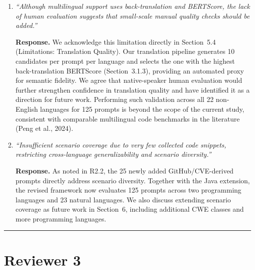 \documentclass[12pt]{article}
\begin{document}
\begin{enumerate}[leftmargin=*, label=\textbf{R2.\arabic*.}]
\item \textit{``Although multilingual support uses back-translation and BERTScore, the
lack of human evaluation suggests that small-scale manual quality checks should be
added.''}

\textbf{Response.}
We acknowledge this limitation directly in Section~5.4 (Limitations: Translation
Quality). Our translation pipeline generates 10 candidates per prompt per language
and selects the one with the highest back-translation BERTScore (Section~3.1.3),
providing an automated proxy for semantic fidelity. We agree that native-speaker
human evaluation would further strengthen confidence in translation quality and have
identified it as a direction for future work. Performing such validation across all
22 non-English languages for 125 prompts is beyond the scope of the current study,
consistent with comparable multilingual code benchmarks in the literature (Peng
et al., 2024).

\item \textit{``Insufficient scenario coverage due to very few collected code snippets,
restricting cross-language generalizability and scenario diversity.''}

\textbf{Response.}
As noted in R2.2, the 25 newly added GitHub/CVE-derived prompts directly address
scenario diversity. Together with the Java extension, the revised framework now
evaluates 125 prompts across two programming languages and 23 natural languages.
We also discuss extending scenario coverage as future work in Section~6, including
additional CWE classes and more programming languages.

\end{enumerate}

\bigskip\hrule\bigskip

\section*{Reviewer 3}
\end{document}
